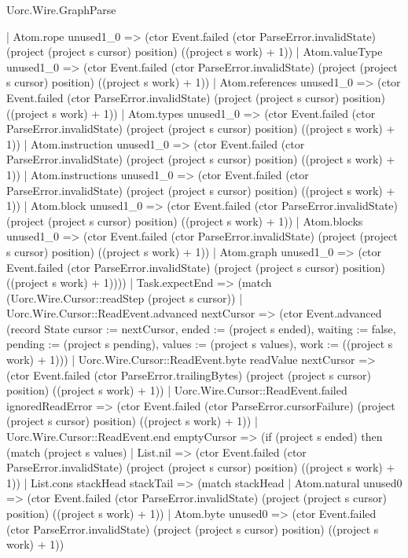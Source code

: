 \begin{lexlean}{Uorc.Wire.GraphParse}
\begin{semanticmodule}
{          | Atom.rope unused1_0 => (ctor Event.failed (ctor ParseError.invalidState) (project (project s cursor) position) ((project s work) + 1))
          | Atom.valueType unused1_0 => (ctor Event.failed (ctor ParseError.invalidState) (project (project s cursor) position) ((project s work) + 1))
          | Atom.references unused1_0 => (ctor Event.failed (ctor ParseError.invalidState) (project (project s cursor) position) ((project s work) + 1))
          | Atom.types unused1_0 => (ctor Event.failed (ctor ParseError.invalidState) (project (project s cursor) position) ((project s work) + 1))
          | Atom.instruction unused1_0 => (ctor Event.failed (ctor ParseError.invalidState) (project (project s cursor) position) ((project s work) + 1))
          | Atom.instructions unused1_0 => (ctor Event.failed (ctor ParseError.invalidState) (project (project s cursor) position) ((project s work) + 1))
          | Atom.block unused1_0 => (ctor Event.failed (ctor ParseError.invalidState) (project (project s cursor) position) ((project s work) + 1))
          | Atom.blocks unused1_0 => (ctor Event.failed (ctor ParseError.invalidState) (project (project s cursor) position) ((project s work) + 1))
          | Atom.graph unused1_0 => (ctor Event.failed (ctor ParseError.invalidState) (project (project s cursor) position) ((project s work) + 1))))
      | Task.expectEnd => (match (Uorc.Wire.Cursor::readStep (project s cursor))
        | Uorc.Wire.Cursor::ReadEvent.advanced nextCursor => (ctor Event.advanced (record State {cursor := nextCursor, ended := (project s ended), waiting := false, pending := (project s pending), values := (project s values), work := ((project s work) + 1)}))
        | Uorc.Wire.Cursor::ReadEvent.byte readValue nextCursor => (ctor Event.failed (ctor ParseError.trailingBytes) (project (project s cursor) position) ((project s work) + 1))
        | Uorc.Wire.Cursor::ReadEvent.failed ignoredReadError => (ctor Event.failed (ctor ParseError.cursorFailure) (project (project s cursor) position) ((project s work) + 1))
        | Uorc.Wire.Cursor::ReadEvent.end emptyCursor => (if (project s ended) then (match (project s values)
          | List.nil => (ctor Event.failed (ctor ParseError.invalidState) (project (project s cursor) position) ((project s work) + 1))
          | List.cons stackHead stackTail => (match stackHead
            | Atom.natural unused0 => (ctor Event.failed (ctor ParseError.invalidState) (project (project s cursor) position) ((project s work) + 1))
            | Atom.byte unused0 => (ctor Event.failed (ctor ParseError.invalidState) (project (project s cursor) position) ((project s work) + 1))
}
\end{semanticmodule}
\end{lexlean}
